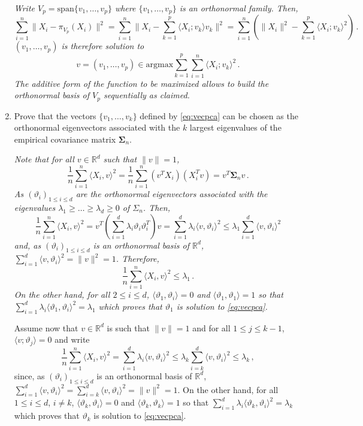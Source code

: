 \documentclass[a4paper,10pt,fleqn]{article}
\newcommand{\eqsp}{\,}
\newcommand{\rset}{\ensuremath{\mathbb{R}}}
\newcommand{\1}{\ensuremath{\mathbbm{1}}}
\newcommand{\bfs}{\mathbf{\Sigma}}
\begin{document}
\begin{enumerate}
\vspace{.2cm}

{\em
Write $V_p = \mathrm{span}\{v_1,\ldots,v_p\}$ where $\{v_1,\ldots,v_p\}$ is an orthonormal family. Then,
$$
\sum_{i=1}^n\|X_i - \pi_{V_p}(X_i)\|^2  = \sum_{i=1}^n\|X_i -  \sum_{k=1}^p\langle X_i; v_k \rangle v_k \|^2= \sum_{i=1}^n \left( \|X_i\|^2 -  \sum_{k=1}^p \langle X_i; v_k \rangle^2 \right)\eqsp.
$$
 $(v_1,\ldots,v_p)$ is therefore solution to 
$$
v = (v_1,\ldots,v_p) \in \mathrm{argmax} \sum_{k=1}^p  \sum_{i=1}^n \langle X_i; v_k \rangle^2\eqsp.
$$
The additive form of the function to be maximized allows to build the orthonormal basis of $V_p$ sequentially as claimed.
}
\item Prove that the vectors $\{v_1, \ldots , v_k\}$ defined by \eqref{eq:vecpca} can be chosen as the orthonormal eigenvectors associated with the $k$ largest eigenvalues of the empirical covariance matrix $\bfs_n$.

\vspace{.2cm}

{\em
Note that for all $v\in \rset^d$ such that $\|v\|=1$,
$$
\frac{1}{n}\sum_{i=1}^n\langle X_i,v\rangle^2 = \frac{1}{n}\sum_{i=1}^n (v^TX_i)(X^T_iv) = v^T\bfs_n v\eqsp.
$$
As $(\vartheta_i)_{1\leqslant i \leqslant d}$ are the orthonormal eigenvectors associated with the eigenvalues $\lambda_1\geqslant \ldots \geqslant\lambda_d\geqslant 0$ of $\Sigma_n$. Then,
$$
\frac{1}{n}\sum_{i=1}^n\langle X_i,v\rangle^2 = v^T\left(\sum_{i=1}^d \lambda_i \vartheta_i\vartheta^T_i\right)v = \sum_{i=1}^d \lambda_i \langle v,\vartheta_i\rangle^2\leqslant \lambda_1  \sum_{i=1}^d \langle v,\vartheta_i\rangle^2
$$
and, as $(\vartheta_i)_{1\leqslant i \leqslant d}$ is an orthonormal basis of $\rset^d$,  $\sum_{i=1}^d \langle v,\vartheta_i\rangle^2 = \|v\|^2 = 1$. Therefore,
$$
\frac{1}{n}\sum_{i=1}^n\langle X_i,v\rangle^2 \leqslant \lambda_1\eqsp.
$$
On the other hand, for all $2\leqslant i \leqslant d$, $\langle \vartheta_1,\vartheta_i\rangle =0$ and $\langle \vartheta_1,\vartheta_1\rangle=1$ so that $\sum_{i=1}^d \lambda_i \langle \vartheta_1,\vartheta_i\rangle^2 = \lambda_1$ which proves that $\vartheta_1$ is solution to \eqref{eq:vecpca}.

Assume now that  $v\in \rset^d$ is such that $\|v\|=1$ and for all $1\leqslant j \leqslant k-1$,  $\langle v ; \vartheta_j\rangle = 0$ and write
$$
\frac{1}{n}\sum_{i=1}^n\langle X_i,v\rangle^2 = \sum_{i=1}^d \lambda_i \langle v,\vartheta_i\rangle^2\le \lambda_k  \sum_{i=k}^d \langle v,\vartheta_i\rangle^2 \le \lambda_k\eqsp,
$$
since, as $(\vartheta_i)_{1\leqslant i \leqslant d}$ is an orthonormal basis of $\rset^d$,  $\sum_{i=1}^d \langle v,\vartheta_i\rangle^2 = \sum_{i=k}^d \langle v,\vartheta_i\rangle^2 = \|v\|^2 = 1$. On the other hand, for all $1\leqslant i \leqslant d$, $i\neq k$, $\langle \vartheta_k,\vartheta_i\rangle =0$ and $\langle \vartheta_k,\vartheta_k\rangle=1$ so that $\sum_{i=1}^d \lambda_i \langle \vartheta_k,\vartheta_i\rangle^2 = \lambda_k$ which proves that $\vartheta_k$ is solution to \eqref{eq:vecpca}.

}
\end{enumerate}
\end{document}
